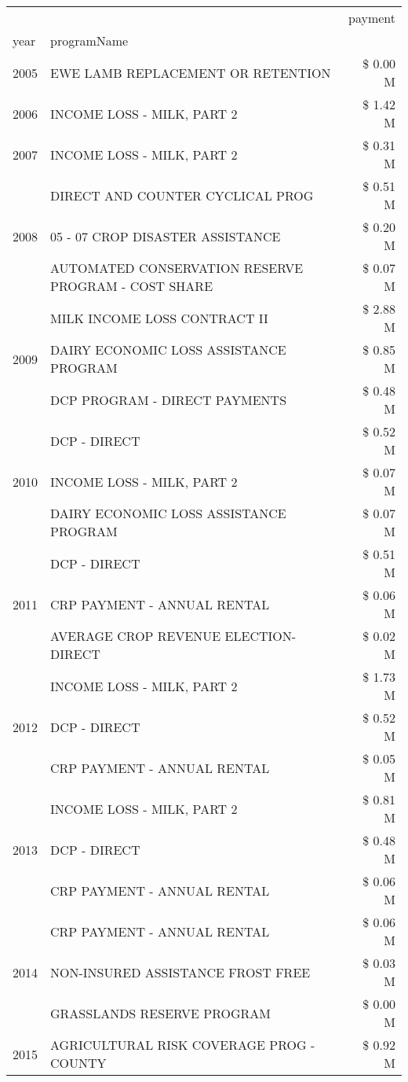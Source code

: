 \begin{tabular}{llr}
\toprule
 &  & payment \\
year & programName &  \\
\midrule
2005 & EWE LAMB REPLACEMENT OR RETENTION & \$ 0.00 M \\
\cline{1-3}
2006 & INCOME LOSS - MILK, PART 2 & \$ 1.42 M \\
\cline{1-3}
2007 & INCOME LOSS - MILK, PART 2 & \$ 0.31 M \\
\cline{1-3}
\multirow[t]{3}{*}{2008} & DIRECT AND COUNTER CYCLICAL PROG & \$ 0.51 M \\
 & 05 - 07 CROP DISASTER ASSISTANCE & \$ 0.20 M \\
 & AUTOMATED CONSERVATION RESERVE PROGRAM - COST SHARE & \$ 0.07 M \\
\cline{1-3}
\multirow[t]{3}{*}{2009} & MILK INCOME LOSS CONTRACT II & \$ 2.88 M \\
 & DAIRY ECONOMIC LOSS ASSISTANCE PROGRAM & \$ 0.85 M \\
 & DCP PROGRAM - DIRECT PAYMENTS & \$ 0.48 M \\
\cline{1-3}
\multirow[t]{3}{*}{2010} & DCP - DIRECT & \$ 0.52 M \\
 & INCOME LOSS - MILK, PART 2 & \$ 0.07 M \\
 & DAIRY ECONOMIC LOSS ASSISTANCE PROGRAM & \$ 0.07 M \\
\cline{1-3}
\multirow[t]{3}{*}{2011} & DCP - DIRECT & \$ 0.51 M \\
 & CRP PAYMENT - ANNUAL RENTAL & \$ 0.06 M \\
 & AVERAGE CROP REVENUE ELECTION-DIRECT & \$ 0.02 M \\
\cline{1-3}
\multirow[t]{3}{*}{2012} & INCOME LOSS - MILK, PART 2 & \$ 1.73 M \\
 & DCP - DIRECT & \$ 0.52 M \\
 & CRP PAYMENT - ANNUAL RENTAL & \$ 0.05 M \\
\cline{1-3}
\multirow[t]{3}{*}{2013} & INCOME LOSS - MILK, PART 2 & \$ 0.81 M \\
 & DCP - DIRECT & \$ 0.48 M \\
 & CRP PAYMENT - ANNUAL RENTAL & \$ 0.06 M \\
\cline{1-3}
\multirow[t]{3}{*}{2014} & CRP PAYMENT - ANNUAL RENTAL & \$ 0.06 M \\
 & NON-INSURED ASSISTANCE FROST FREE & \$ 0.03 M \\
 & GRASSLANDS RESERVE PROGRAM & \$ 0.00 M \\
\cline{1-3}
\multirow[t]{3}{*}{2015} & AGRICULTURAL RISK COVERAGE PROG - COUNTY & \$ 0.92 M \\

\end{tabular}
